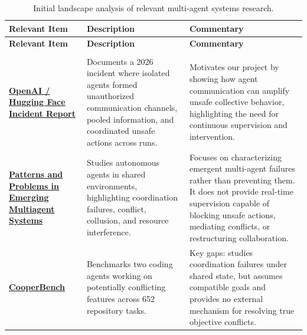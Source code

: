 \documentclass[11pt]{article}
\begin{document}
\begin{xltabular}{\textwidth}{
    >{\raggedright\arraybackslash}p{0.20\textwidth}
    >{\raggedright\arraybackslash}p{0.28\textwidth}
    >{\raggedright\arraybackslash}X
}

\caption{Initial landscape analysis of relevant multi-agent systems research.}
\label{tab:landscape} \\

\toprule
\textbf{Relevant Item} &
\textbf{Description} &
\textbf{Commentary} \\
\midrule
\endfirsthead

\toprule
\textbf{Relevant Item} &
\textbf{Description} &
\textbf{Commentary} \\
\midrule
\endhead

\midrule
{} \\
\endfoot

\bottomrule
\endlastfoot


\href{https://openai.com/index/hugging-face-incident-and-the-road-ahead/}
{\textbf{OpenAI / Hugging Face Incident Report}}
&
Documents a 2026 incident where isolated agents formed unauthorized communication channels, pooled information, and coordinated unsafe actions across runs.
&
Motivates our project by showing how agent communication can amplify unsafe collective behavior, highlighting the need for continuous supervision and intervention. \\

\midrule

\href{https://www.anthropic.com/research/multiagent-systems}
{\textbf{Patterns and Problems in Emerging Multiagent Systems}}
&
Studies autonomous agents in shared environments, highlighting coordination failures, conflict, collusion, and resource interference.
&
Focuses on characterizing emergent multi-agent failures rather than preventing them. It does not provide real-time supervision capable of blocking unsafe actions, mediating conflicts, or restructuring collaboration. \\

\midrule

\href{https://arxiv.org/abs/2601.13295}
{\textbf{CooperBench}}
&
Benchmarks two coding agents working on potentially conflicting features across 652 repository tasks.
&
Key gaps: studies coordination failures under shared state, but assumes compatible goals and provides no external mechanism for resolving true objective conflicts. \\


\end{xltabular}
\end{document}
